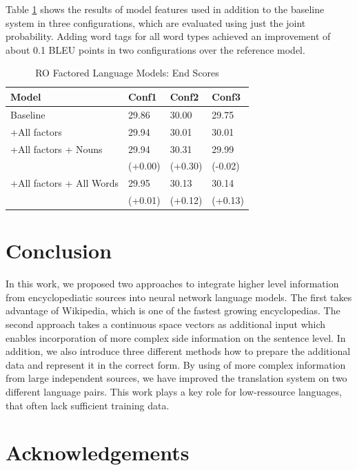 \documentclass[a4paper]{article}
\begin{document}
Table \ref{tb:ro-factored-combi} shows the results of model features used in addition to the baseline system in three configurations, which are evaluated using just the joint probability. 
Adding word tags for all word types achieved an improvement of about 0.1 BLEU points in two configurations over the reference model.

\begin{table}
\caption{RO Factored Language Models: End Scores}
\centering
  \begin{tabular}{llll}
  	\hline
  	Model                    & Conf1   & Conf2   & Conf3   \\ \hline\hline
  	Baseline                 & 29.86   & 30.00   & 29.75   \\
  	+All factors             & 29.94   & 30.01   & 30.01   \\ \hline
  	+All factors + Nouns     & 29.94   & 30.31   & 29.99   \\
  	                         & (+0.00) & (+0.30) & (-0.02) \\
  	+All factors + All Words & 29.95   & 30.13   & 30.14   \\
  	                         & (+0.01) & (+0.12) & (+0.13)
  \end{tabular}
  \label{tb:ro-factored-combi}
\end{table}


\section{Conclusion}
In this work, we proposed two approaches to integrate higher level information from encyclopediatic sources into neural network language models. The first takes advantage of Wikipedia, which is one of the fastest growing encyclopedias. The second approach takes a continuous space vectors as additional input which enables incorporation of more complex side information on the sentence level. In addition, we  also introduce three different methods how to prepare the additional data and represent it in the correct form.
By using of more complex information from large independent sources, we have improved the translation system on two different language pairs.  
This work plays a key role for low-ressource languages, that often lack sufficient training data. 



\section{Acknowledgements}
\end{document}
